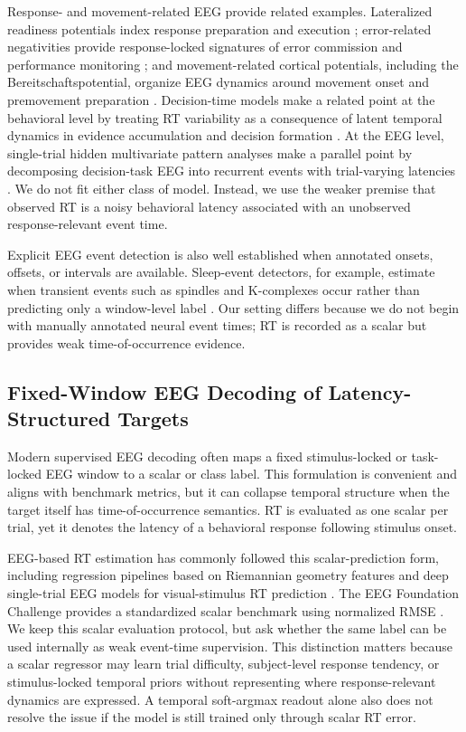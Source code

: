 \documentclass[12pt]{article}
\begin{document}
Response- and movement-related EEG provide related examples. Lateralized readiness potentials index response preparation and execution \citep{Coles1989LRP}; error-related negativities provide response-locked signatures of error commission and performance monitoring \citep{Gehring1993ErrorDetection,HolroydColes2002ERN}; and movement-related cortical potentials, including the Bereitschaftspotential, organize EEG dynamics around movement onset and premovement preparation \citep{KornhuberDeecke1965BP,ShibasakiHallett2006BP}. Decision-time models make a related point at the behavioral level by treating RT variability as a consequence of latent temporal dynamics in evidence accumulation and decision formation \citep{Ratcliff2008Diffusion,OConnell2012Supramodal,Kelly2013Internal}. At the EEG level, single-trial hidden multivariate pattern analyses make a parallel point by decomposing decision-task EEG into recurrent events with trial-varying latencies \citep{Weindel2025DecisionComponents}. We do not fit either class of model. Instead, we use the weaker premise that observed RT is a noisy behavioral latency associated with an unobserved response-relevant event time.

Explicit EEG event detection is also well established when annotated onsets, offsets, or intervals are available. Sleep-event detectors, for example, estimate when transient events such as spindles and K-complexes occur rather than predicting only a window-level label \citep{Chambon2019DOSED,TapiaRivas2024SEED}. Our setting differs because we do not begin with manually annotated neural event times; RT is recorded as a scalar but provides weak time-of-occurrence evidence.

\subsection{Fixed-Window EEG Decoding of Latency-Structured Targets}
Modern supervised EEG decoding often maps a fixed stimulus-locked or task-locked EEG window to a scalar or class label. This formulation is convenient and aligns with benchmark metrics, but it can collapse temporal structure when the target itself has time-of-occurrence semantics. RT is evaluated as one scalar per trial, yet it denotes the latency of a behavioral response following stimulus onset.

EEG-based RT estimation has commonly followed this scalar-prediction form, including regression pipelines based on Riemannian geometry features \citep{Wu2017RiemannianRT} and deep single-trial EEG models for visual-stimulus RT prediction \citep{Chowdhury2020RTSensors}. The EEG Foundation Challenge provides a standardized scalar benchmark using normalized RMSE \citep{EEGFoundationChallengeArxiv2025,EEGChallengeWebsite2025}. We keep this scalar evaluation protocol, but ask whether the same label can be used internally as weak event-time supervision. This distinction matters because a scalar regressor may learn trial difficulty, subject-level response tendency, or stimulus-locked temporal priors without representing where response-relevant dynamics are expressed. A temporal soft-argmax readout alone also does not resolve the issue if the model is still trained only through scalar RT error.
\end{document}
